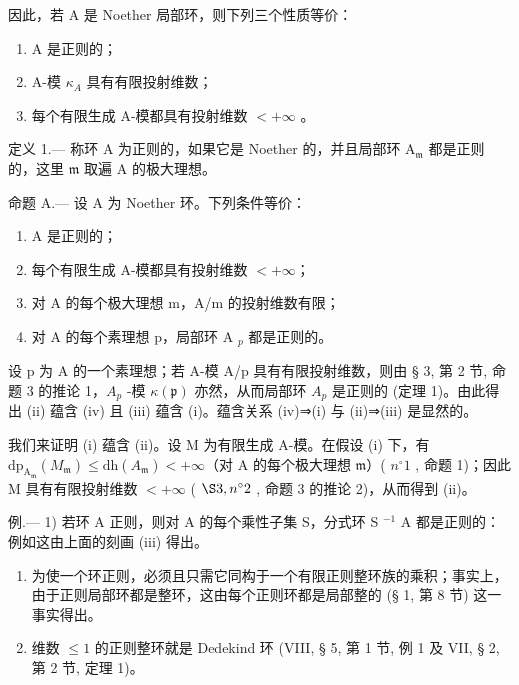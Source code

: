 因此，若 A 是 Noether 局部环，则下列三个性质等价：

\begin{enumerate}
\def\labelenumi{(\roman{enumi})}
\item
  A 是正则的；
\item
  A-模 \(\kappa_{A}\) 具有有限投射维数；
\item
  每个有限生成 A-模都具有投射维数 \(<+\infty\) 。
\end{enumerate}

定义 1.--- 称环 A 为正则的，如果它是 Noether 的，并且局部环 \(\mathrm{A}_{\mathfrak{m}}\) 都是正则的，这里 \(\mathfrak{m}\) 取遍 \(\mathrm{A}\) 的极大理想。

命题 A.--- 设 A 为 Noether 环。下列条件等价：

\begin{enumerate}
\def\labelenumi{(\roman{enumi})}
\item
  A 是正则的；
\item
  每个有限生成 A-模都具有投射维数 \(< +\infty\)；
\item
  对 A 的每个极大理想 m，A/m 的投射维数有限；
\item
  对 A 的每个素理想 p，局部环 A \(_{p}\) 都是正则的。
\end{enumerate}

设 p 为 A 的一个素理想；若 A-模 A/p 具有有限投射维数，则由 § 3, 第 2 节, 命题 3 的推论 1，\(A_{p}\) -模 \(\kappa(\mathfrak{p})\) 亦然，从而局部环 \(A_{p}\) 是正则的 (定理 1)。由此得出 (ii) 蕴含 (iv) 且 (iii) 蕴含 (i)。蕴含关系 (iv)⇒(i) 与 (ii)⇒(iii) 是显然的。

我们来证明 (i) 蕴含 (ii)。设 M 为有限生成 A-模。在假设 (i) 下，有 \(\mathrm{dp}_{\mathrm{A}_{\mathfrak{m}}}(M_{\mathfrak{m}}) \leqslant \mathrm{dh}(A_{\mathfrak{m}}) < +\infty\)（对 A 的每个极大理想 \(\mathfrak{m}\)）( \(n^{\circ} 1\) , 命题 1)；因此 M 具有有限投射维数 \(< +\infty\) ( \(\S 3, n^{\circ} 2\) , 命题 3 的推论 2)，从而得到 (ii)。

例.--- 1) 若环 A 正则，则对 A 的每个乘性子集 S，分式环 S \(^{-1}\) A 都是正则的：例如这由上面的刻画 (iii) 得出。

\begin{enumerate}
\def\labelenumi{\arabic{enumi})}
\setcounter{enumi}{1}
\item
  为使一个环正则，必须且只需它同构于一个有限正则整环族的乘积；事实上，由于正则局部环都是整环，这由每个正则环都是局部整的 (§ 1, 第 8 节) 这一事实得出。
\item
  维数 \(\leqslant 1\) 的正则整环就是 Dedekind 环 (VIII, § 5, 第 1 节, 例 1 及 VII, § 2, 第 2 节, 定理 1)。
\end{enumerate}

